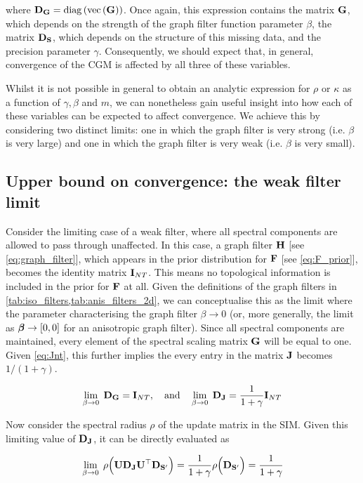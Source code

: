 where $\mathbf{D}_{\mathbf{G}} = \text{\textup{diag}}\left(\text{\textup{vec}}\left(\mathbf{G}\right)\right)$. Once again, this expression contains the matrix $\mathbf{G}$, which depends on the strength of the graph filter function parameter $\beta$, the matrix $\mathbf{D}_{\mathbf{S}}$, which depends on the structure of this missing data, and the precision parameter $\gamma$. Consequently, we should expect that, in general, convergence of the CGM is affected by all three of these variables. 

Whilst it is not possible in general to obtain an analytic expression for $\rho$ or $\kappa$ as a function of $\gamma, \beta$ and $m$, we can nonetheless gain useful insight into how each of these variables can be expected to affect convergence. We achieve this by considering two distinct limits: one in which the graph filter is very strong (i.e. $\beta$ is very large) and one in which the graph filter is very weak (i.e. $\beta$ is very small). 

\subsection{Upper bound on convergence: the weak filter limit}

\label{sec:wfl_derivation}

Consider the limiting case of a weak filter, where all spectral components are allowed to pass through unaffected. In this case, a graph filter $\mathbf{H}$ [see \cref{eq:graph_filter}], which appears in the prior distribution for $\mathbf{F}$ [see \cref{eq:F_prior}], becomes the identity matrix $\mathbf{I}_{NT}$. This means no topological information is included in the prior for $\mathbf{F}$ at all. Given the definitions of the graph filters in \cref{tab:iso_filters,tab:anis_filters_2d}, we can conceptualise this as the limit where the parameter characterising the graph filter $\beta \rightarrow 0$ (or, more generally, the limit as $\boldsymbol{\beta} \rightarrow [0, 0]$ for an anisotropic graph filter). Since all spectral components are maintained, every element of the spectral scaling matrix $\mathbf{G}$ will be equal to one. Given \cref{eq:Jnt}, this further implies the every entry in the matrix $\mathbf{J}$ becomes $1 / (1 + \gamma)$. 

$$
\lim_{\beta \rightarrow 0} \; \mathbf{D}_{\mathbf{G}} = \mathbf{I}_{NT}, \quad \text{and} \quad \lim_{\beta \rightarrow 0} \; \mathbf{D}_{\mathbf{J}} = \frac{1}{1 + \gamma} \mathbf{I}_{NT}
$$

Now consider the spectral radius $\rho$ of the update matrix in the SIM. Given this limiting value of $\mathbf{D}_{\mathbf{J}}$, it can be directly evaluated as

\begin{equation}
    \lim_{\beta \rightarrow 0} \; \rho\Big(\mathbf{U} \mathbf{D}_{\mathbf{J}} \mathbf{U}^\top \mathbf{D}_{\mathbf{S}'} \Big)
    = \frac{1}{1 + \gamma} \rho\Big(\mathbf{D}_{\mathbf{S}'} \Big)
    = \frac{1}{1 + \gamma} \label{eq:beta_lim_0} 
\end{equation}


